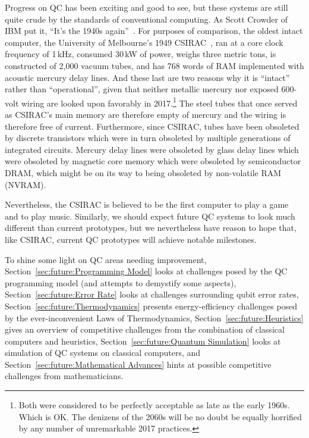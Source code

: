 Progress on QC has been exciting and good to see, but these systems are
still quite crude by the standards of conventional computing.
As Scott Crowder of IBM put it,
``It's the 1940s again''~\cite{BradJones2017IBM-QC-Crowder}.
For purposes of comparison, the oldest intact computer, the
University of Melbourne's 1949
CSIRAC~\cite{CSIRACMuseumVictoria,CSIRACUniversityMelbourne},
ran at a core clock frequency of 1\,kHz, consumed 30\,kW of power,
weighs three metric tons,
is constructed of 2,000 vacuum tubes, and has 768 words of RAM
implemented with acoustic mercury delay lines.
And these last are two reasons why it is ``intact'' rather than
``operational'', given that
neither metallic mercury nor exposed 600-volt wiring are
looked upon favorably in 2017.\footnote{
	Both were considered to be perfectly acceptable as late as the
	early 1960s.
	Which is OK.
	The denizens of the 2060s will be no doubt be equally horrified
	by any number of unremarkable 2017 practices.}
The steel tubes that once served as CSIRAC's main memory are therefore
empty of mercury and the wiring is therefore free of current.
Furthermore, since CSIRAC, tubes have been obsoleted by discrete
transistors which were in turn obsoleted by multiple generations of
integrated circuits.
Mercury delay lines were obsoleted by glass delay lines which were
obsoleted by magnetic core memory which were obsoleted by
semiconductor DRAM, which might be on its way to being obsoleted
by non-volatile RAM (NVRAM).

Nevertheless, the CSIRAC is believed to be the first computer to
play a game and to play music.
Similarly, we should expect future QC systems to look much different
than current prototypes, but we nevertheless have reason to hope that,
like CSIRAC, current QC prototypes will achieve notable milestones.

To shine some light on QC areas needing improvement,
Section~\ref{sec:future:Programming Model} looks at challenges posed by the QC
programming model (and attempts to demystify some aspects),
Section~\ref{sec:future:Error Rate} looks at challenges surrounding qubit
error rates,
Section~\ref{sec:future:Thermodynamics} presents energy-efficiency challenges
posed by the ever-inconvenient Laws of Thermodynamics,
Section~\ref{sec:future:Heuristics} gives an overview of competitive
challenges from the combination of classical computers and heuristics,
Section~\ref{sec:future:Quantum Simulation} looks at simulation of QC
systems on classical computers,
and
Section~\ref{sec:future:Mathematical Advances} hints at possible competitive
challenges from mathematicians.

